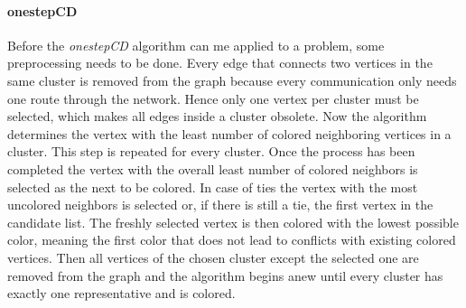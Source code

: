 \documentclass[paper=a4,fontsize=12pt]{scrartcl}
\begin{document}

\paragraph{onestepCD}{
\label{sec:construct}
Before the \emph{onestepCD} algorithm can me applied to a problem, some preprocessing needs to be done. Every edge that connects two vertices in the same cluster is removed from the graph because every communication only needs one route through the network. Hence only one vertex per cluster must be selected, which makes all edges inside a cluster obsolete. Now the algorithm determines the vertex with the least number of colored neighboring vertices in a cluster. This step is repeated for every cluster. Once the process has been completed the vertex with the overall least number of colored neighbors is selected as the next to be colored. In case of ties the vertex with the most uncolored neighbors is selected or, if there is still a tie, the first vertex in the candidate list. The freshly selected vertex is then colored with the lowest possible color, meaning the first color that does not lead to conflicts with existing colored vertices. Then all vertices of the chosen cluster except the selected one are removed from the graph and the algorithm begins anew until every cluster has exactly one representative and is colored. 

}
\end{document}
